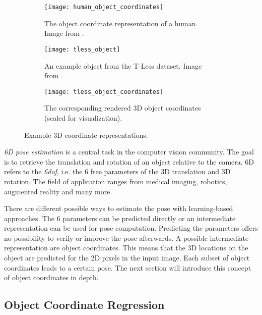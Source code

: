 \begin{figure}[!tbp]
	\centering
	\begin{subfigure}[t]{0.29\textwidth}
		\centering
    	\texttt{[image: human\_object\_coordinates]}
    	\caption{The object coordinate representation of a human. Image from \cite{tsharp}.}
    	\label{fig:human_object_coordinates}
	\end{subfigure}
	\hspace{5mm}
	\begin{subfigure}[t]{0.29\textwidth}
		\centering
    	\texttt{[image: tless\_object]}
    	\caption{An example object from the T-Less dataset. Image from \cite{tless}.}
    	\label{fig:tless_object}
	\end{subfigure}
	\hspace{5mm}
	\begin{subfigure}[t]{0.29\textwidth}
		\centering
    	\texttt{[image: tless\_object\_coordinates]}
    	\caption{The corresponding rendered 3D object coordinates (scaled for visualization).}
    	\label{fig:tless_object_coordinates}
	\end{subfigure}
	\caption{Example 3D coordinate representations.}
\end{figure} 

\textit{6D pose estimation} is a central task in the computer vision community. The goal is to retrieve the translation and rotation of an object relative to the camera. 6D refers to the \textit{\ac{6dof}}, i.e. the 6 free parameters of the 3D translation and 3D rotation. The field of application ranges from medical imaging, robotics, augmented reality and many more.

There are different possible ways to estimate the pose with learning-based approaches. The 6 parameters can be predicted directly or an intermediate representation can be used for pose computation. Predicting the parameters offers no possibility to verify or improve the pose afterwards. A possible intermediate representation are object coordinates. This means that the 3D locations on the object are predicted for the 2D pixels in the input image. Each subset of object coordinates leads to a certain pose. The next section will introduce this concept of object coordinates in depth.

\subsection{Object Coordinate Regression} \label{objectcoordinates}

